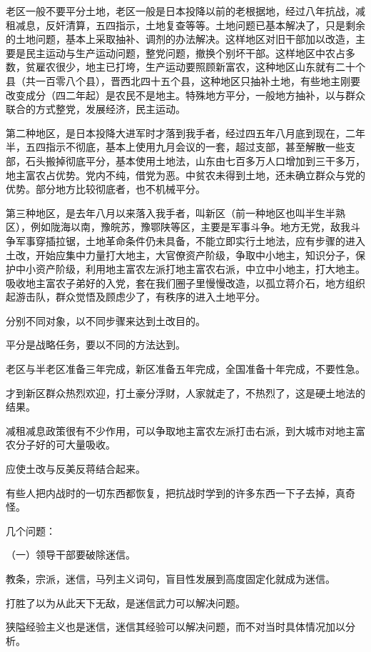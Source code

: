{老区一般不要平分土地，老区一般是日本投降以前的老根据地，经过八年抗战，减租减息，反奸清算，五四指示，土地复查等等。土地问题已基本解决了，只是剩余的土地问题，基本上采取抽补、调剂的办法解决。这样地区对旧干部加以改造，主要是民主运动与生产运动问题，整党问题，撤换个别坏干部。这样地区中农占多数，贫雇农很少，地主已打垮，生产运动要照顾新富农，这种地区山东就有二十个县（共一百零八个县），晋西北四十五个县，这种地区只抽补土地，有些地主刚要改变成分（四二年起）是农民不是地主。特殊地方平分，一般地方抽补，以与群众联合的方式整党，发展经济，民主运动。

第二种地区，是日本投降大进军时才落到我手者，经过四五年八月底到现在，二年半，五四指示不彻底，基本上使用九月会议的一套，超过支部，甚至解散一些支部，石头搬掉彻底平分，基本使用土地法，山东由七百多万人口增加到三干多万，地主富农占优势。党内不纯，借党为恶。中贫农未得到土地，还未确立群众与党的优势。部分地方比较彻底者，也不机械平分。

第三种地区，是去年八月以来落入我手者，叫新区（前一种地区也叫半生半熟区），例如陇海以南，豫皖苏，豫鄂陕等区，主要是军事斗争。地方无党，敌我斗争军事穿插拉锯，土地革命条件仍未具备，不能立即实行土地法，应有步骤的进入土改，开始应集中力量打大地主，大官僚资产阶级，争取中小地主，知识分子，保护中小资产阶级，利用地主富农左派打地主富农右派，中立中小地主，打大地主。吸收地主富农子弟好的入党，套在我们圈子里慢慢改造，以孤立蒋介石，地方组织起游击队，群众觉悟及顾虑少了，有秩序的进入土地平分。

分别不同对象，以不同步骤来达到土改目的。

平分是战略任务，要以不同的方法达到。

老区与半老区准备三年完成，新区准备五年完成，全国准备十年完成，不要性急。

才到新区群众热烈欢迎，打土豪分浮财，人家就走了，不热烈了，这是硬土地法的结果。

减租减息政策很有不少作用，可以争取地主富农左派打击右派，到大城市对地主富农分子好的可大量吸收。

应使土改与反美反蒋结合起来。

有些人把内战时的一切东西都恢复，把抗战时学到的许多东西一下子去掉，真奇怪。

几个问题：

（一）领导干部要破除迷信。

教条，宗派，迷信，马列主义词句，盲目性发展到高度固定化就成为迷信。

打胜了以为从此天下无敌，是迷信武力可以解决问题。

狭隘经验主义也是迷信，迷信其经验可以解决问题，而不对当时具体情况加以分析。

}
